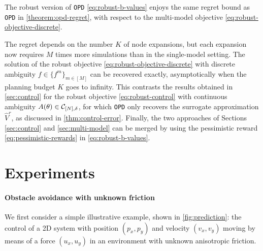 \documentclass{article}
\begin{document}
\begin{theorem}
\label{theorem:drop-regret}
The robust version of \texttt{OPD} \eqref{eq:robust-b-values} enjoys the same regret bound as \texttt{OPD} in \autoref{theorem:opd-regret}, with respect to the multi-model objective \eqref{eq:robust-objective-discrete}.
\end{theorem}

The regret depends on the number $K$ of node expansions, but each expansion now requires $M$ times more simulations than in the single-model setting. The solution of the robust objective \eqref{eq:robust-objective-discrete} with discrete ambiguity $f\in\{f^m\}_{m\in[M]}$ can be recovered exactly, asymptotically when the planning budget $K$ goes to infinity. This contrasts the results obtained in \autoref{sec:control} for the robust objective \eqref{eq:robust-control} with continuous ambiguity $A(\theta)\in\mathcal{C}_{[N],\delta}$, for which \texttt{OPD} only recovers the surrogate approximation $\hat{V}^r$, as discussed in \autoref{thm:control-error}. Finally, the two approaches of Sections \ref{sec:control} and \ref{sec:multi-model} can be merged by using the pessimistic reward \eqref{eq:pessimistic-rewards} in \eqref{eq:robust-b-values}.

\section{Experiments}
\label{sec:experiments}

\paragraph{Obstacle avoidance with unknown friction}
We first consider a simple illustrative example, shown in \autoref{fig:prediction}: the control of a 2D system with position $(p_x,p_y)$ and velocity $(v_x, v_y)$ moving by means of a force $(u_x, u_y)$ in an environment with unknown anisotropic friction.
\end{document}
